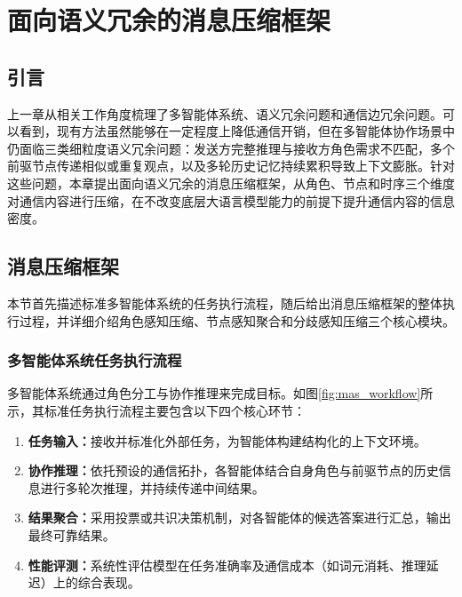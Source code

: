 
\chapter{面向语义冗余的消息压缩框架}

\section{引言}

上一章从相关工作角度梳理了多智能体系统、语义冗余问题和通信边冗余问题。可以看到，现有方法虽然能够在一定程度上降低通信开销，但在多智能体协作场景中仍面临三类细粒度语义冗余问题：发送方完整推理与接收方角色需求不匹配，多个前驱节点传递相似或重复观点，以及多轮历史记忆持续累积导致上下文膨胀。针对这些问题，本章提出面向语义冗余的消息压缩框架，从角色、节点和时序三个维度对通信内容进行压缩，在不改变底层大语言模型能力的前提下提升通信内容的信息密度。

\section{消息压缩框架}

本节首先描述标准多智能体系统的任务执行流程，随后给出消息压缩框架的整体执行过程，并详细介绍角色感知压缩、节点感知聚合和分歧感知压缩三个核心模块。

\subsection{多智能体系统任务执行流程}

多智能体系统通过角色分工与协作推理来完成目标。如图\ref{fig:mas_workflow}所示，其标准任务执行流程主要包含以下四个核心环节：

\begin{enumerate}[
    topsep=0pt,
    itemsep=0pt,
    parsep=0pt,
    partopsep=0pt,
    leftmargin=0em,
    itemindent=2em,
    label=\arabic*.
]
    \item \textbf{任务输入：}接收并标准化外部任务，为智能体构建结构化的上下文环境。
    \item \textbf{协作推理：}依托预设的通信拓扑，各智能体结合自身角色与前驱节点的历史信息进行多轮次推理，并持续传递中间结果。
    \item \textbf{结果聚合：}采用投票或共识决策机制，对各智能体的候选答案进行汇总，输出最终可靠结果。
    \item \textbf{性能评测：}系统性评估模型在任务准确率及通信成本（如词元消耗、推理延迟）上的综合表现。
\end{enumerate}

